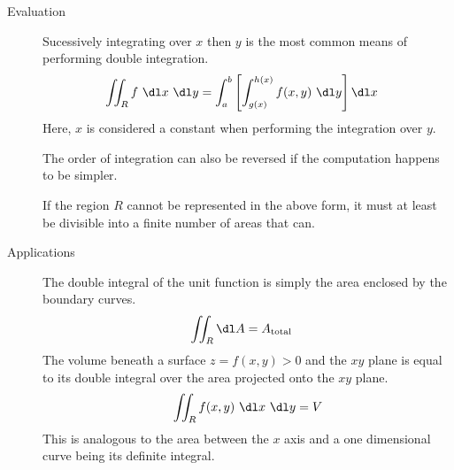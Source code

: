 \begin{description}
    \item[Evaluation] Sucessively integrating over $ x $ then $ y $ is the most
        common means of performing double integration.
        \begin{align}
            \iint_R f\ \dl x\ \dl y & = \int_{a}^{b} \left[ \int_{g(x)}^{h(x)}
                f(x, y)\ \dl y \right] \dl x
        \end{align}
        Here, $ x $ is considered a constant when performing the integration over $ y $.
        \par The order of integration can also be reversed if the computation happens to
        be simpler.
        \begin{figure}[H]
            \centering
        \end{figure}
        If the region $ R $ cannot be represented in the above form, it must at least be
        divisible into a finite number of areas that can.

    \item[Applications] The double integral of the unit function is simply
        the area enclosed by the boundary curves.
        \begin{align}
            \iint_R \dl A & = A_{\text{total}}
        \end{align}
        The volume beneath a surface $ z = f(x, y) > 0 $ and the $ xy $ plane is equal
        to its double integral over the area projected onto the $ xy $ plane.
        \begin{align}
            \iint_R f(x, y)\ \dl x\ \dl y = V
        \end{align}
        This is analogous to the area between the $ x $ axis and a one dimensional curve
        being its definite integral.


\end{description}

